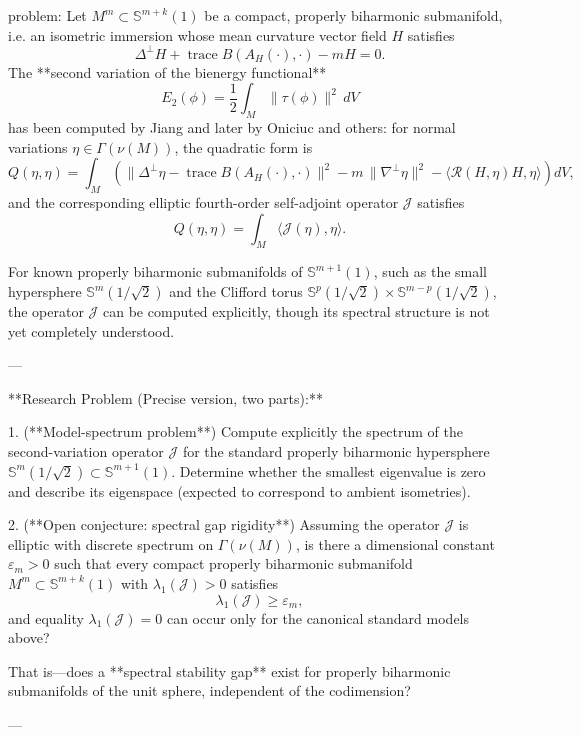 problem:  
Let \(M^m \subset \mathbb{S}^{m+k}(1)\) be a compact, properly biharmonic submanifold, i.e. an isometric immersion whose mean curvature vector field \(H\) satisfies
\[
\Delta^\perp H + \operatorname{trace} B(A_H(\cdot),\cdot) - mH = 0.
\]
The **second variation of the bienergy functional**
\[
E_2(\phi) = \frac12 \int_M \|\tau(\phi)\|^2 \, dV
\]
has been computed by Jiang and later by Oniciuc and others: for normal variations \(\eta \in \Gamma(\nu(M))\), the quadratic form is
\[
Q(\eta,\eta) = \int_M \left( \|\Delta^\perp \eta - \operatorname{trace} B(A_H(\cdot),\cdot)\|^2 
- m\,\|\nabla^\perp \eta\|^2 - \langle \mathcal{R}(H,\eta)H, \eta \rangle \right)dV,
\]
and the corresponding elliptic fourth-order self-adjoint operator \(\mathcal{J}\) satisfies
\[
Q(\eta,\eta) = \int_M \langle \mathcal{J}(\eta), \eta\rangle.
\]

For known properly biharmonic submanifolds of \(\mathbb{S}^{m+1}(1)\), such as the small hypersphere \(\mathbb{S}^m(1/\sqrt{2})\) and the Clifford torus  
\(\mathbb{S}^{p}(1/\sqrt{2})\times \mathbb{S}^{m-p}(1/\sqrt{2}),\)
the operator \(\mathcal{J}\) can be computed explicitly, though its spectral structure is not yet completely understood.

---

**Research Problem (Precise version, two parts):**

1. (**Model-spectrum problem**)  
Compute explicitly the spectrum of the second-variation operator \(\mathcal{J}\) for the standard properly biharmonic hypersphere \(\mathbb{S}^m(1/\sqrt{2})\subset \mathbb{S}^{m+1}(1)\).  
Determine whether the smallest eigenvalue is zero and describe its eigenspace (expected to correspond to ambient isometries).

2. (**Open conjecture: spectral gap rigidity**)  
Assuming the operator \(\mathcal{J}\) is elliptic with discrete spectrum on \(\Gamma(\nu(M))\), is there a dimensional constant \(\varepsilon_m>0\) such that every compact properly biharmonic submanifold \(M^m \subset \mathbb{S}^{m+k}(1)\) with  
\(\lambda_1(\mathcal{J}) > 0\) satisfies
\[
\lambda_1(\mathcal{J}) \ge \varepsilon_m,
\]
and equality \( \lambda_1(\mathcal{J}) = 0 \) can occur only for the canonical standard models above?  

That is—does a **spectral stability gap** exist for properly biharmonic submanifolds of the unit sphere, independent of the codimension?

---

